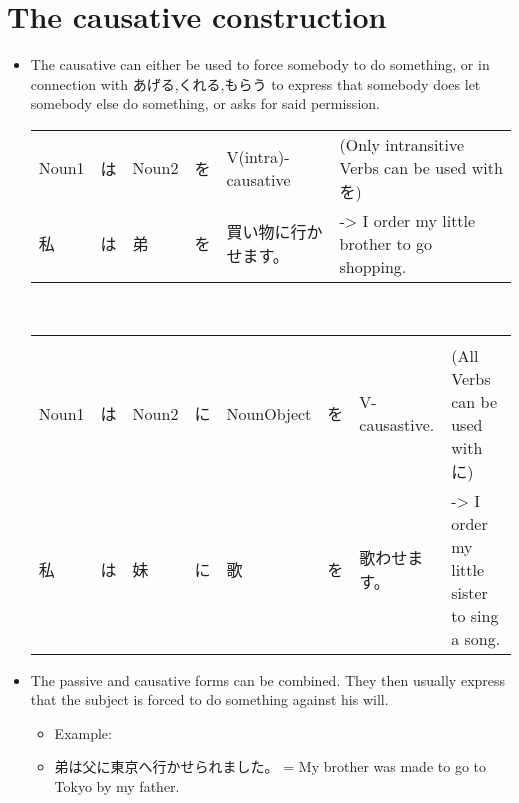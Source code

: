 \documentclass{article}
\begin{document}
\section{The causative construction}
\begin{itemize}
\item The causative can either be used to force somebody to do something, or in connection with あげる,くれる,もらう to express that somebody does let somebody else do something, or asks for said permission. \\
\begin{tabular}{l l l l l|l}
Noun1&は&Noun2&を&V(intra)-causative& (Only intransitive Verbs can be used with を) \\
私&は&弟&を&買い物に行かせます。 &-> I order my little brother to go shopping. \\
\end{tabular} \\
\begin{tabular}{l l l l l l l|l}
\hline \\
Noun1&は&Noun2&に&NounObject&を&V-causastive.& (All Verbs can be used with に)\\
私&は&妹&に&歌&を&歌わせます。 &-> I order my little sister to sing a song.
\end{tabular}
\item The passive and causative forms can be combined. They then usually express that the subject is forced to do something against his will.
\begin{itemize}
\item Example:
\item 弟は父に東京へ行かせられました。 = My brother was made to go to Tokyo by my father.
\end{itemize}
\end{itemize}
\end{document}
